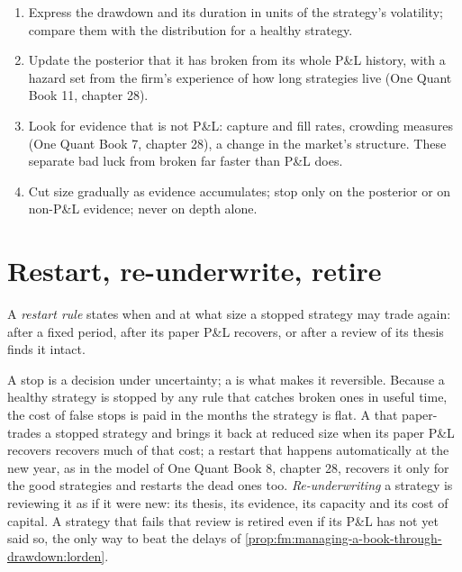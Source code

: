 \begin{method}\label{met:fm:managing-a-book-through-drawdown:review}
\begin{enumerate}
\item Express the drawdown and its duration in units of the strategy's volatility; compare them with the distribution for a healthy strategy.
\item Update the posterior that it has broken from its whole P\&L history, with a hazard set from the firm's experience of how long strategies
live (One Quant Book 11, chapter 28).
\item Look for evidence that is not P\&L: capture and fill rates, crowding measures (One Quant Book 7, chapter 28), a change in the market's
structure. These separate bad luck from broken far faster than P\&L does.
\item Cut size gradually as evidence accumulates; stop only on the posterior or on non-P\&L evidence; never on depth alone.
\end{enumerate}
\end{method}

\section{Restart, re-underwrite, retire}

\begin{definition}\label{def:fm:managing-a-book-through-drawdown:restart}
A \emph{restart rule} states when and at what size a stopped strategy may trade again: after a fixed period, after its paper
P\&L recovers, or after a review of its thesis finds it intact.
\end{definition}

A stop is a decision under uncertainty; a  is what makes it reversible. Because a healthy strategy is stopped by any rule that
catches broken ones in useful time, the cost of false stops is paid in the months the strategy is flat. A  that paper-trades a stopped
strategy and brings it back at reduced size when its paper P\&L recovers recovers much of that cost; a restart that happens automatically at the
new year, as in the model of One Quant Book 8, chapter 28, recovers it only for the good strategies and restarts the dead ones too.
\emph{Re-underwriting} a strategy is reviewing it as if it were new: its thesis, its evidence, its capacity and its cost of capital. A
strategy that fails that review is retired even if its P\&L has not yet said so, the only way to beat the delays of
\cref{prop:fm:managing-a-book-through-drawdown:lorden}.

